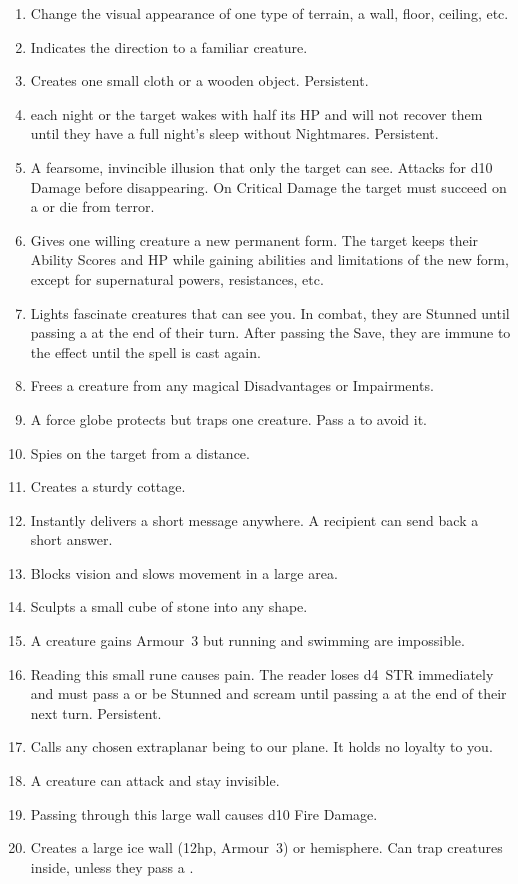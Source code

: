 \documentclass[itdr]{subfiles}
\begin{document}
\begin{enumerate}
	\item {} Change the visual appearance of one type of terrain, a wall, floor, ceiling, etc.
	\item {} Indicates the direction to a familiar creature.
	\item {} Creates one small cloth or a wooden object. Persistent.
	\vfill
	\break
	\item {}  each night or the target wakes with half its HP and will not recover them until they have a full night's sleep without Nightmares. Persistent.
	\item {} A fearsome, invincible illusion that only the target can see. Attacks for d10 Damage before disappearing. On Critical Damage the target must succeed on a  or die from terror.
	\item {} Gives one willing creature a new permanent form. The target keeps their Ability Scores and HP while gaining abilities and limitations of the new form, except for supernatural powers, resistances, etc.
	\item {} Lights fascinate creatures that can see you. In combat, they are Stunned until passing a  at the end of their turn. After passing the Save, they are immune to the effect until the spell is cast again.
	\item {} Frees a creature from any magical Disadvantages or Impairments.
	\item {} A force globe protects but traps one creature. Pass a  to avoid it.
	\item {} Spies on the target from a distance.
	\item {} Creates a sturdy cottage.
	\item {} Instantly delivers a short message anywhere. A recipient can send back a short \mbox{answer}.
	\item {} Blocks vision and slows movement in a large area.
	\item {} Sculpts a small cube of stone into any shape.
	\item {} A creature gains Armour~3 but running and swimming are impossible.
	\item {} Reading this small rune causes pain. The reader loses d4~STR immediately and must pass a  or be Stunned and scream until passing a  at the end of their next turn. Persistent.
	\item {} Calls any chosen extraplanar being to our plane. It holds no loyalty to you.
	\item {} A creature can attack and stay invisible.
	\item {} Passing through this large wall causes d10 Fire Damage.
	\item {} Creates a large ice wall (12hp, Armour~3) or hemisphere. Can trap creatures inside, unless they pass a .
\end{enumerate}
\end{document}

